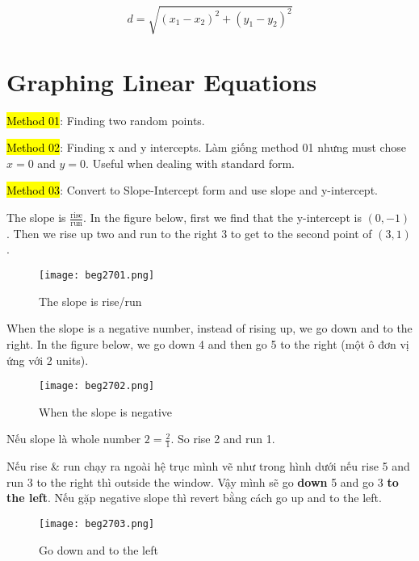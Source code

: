 \begin{equation}
  d = \sqrt{(x_{1}-x_{2})^{2} + (y_{1}-y_{2})^{2}}
  \label{eq:3.2}
\end{equation}

\section{Graphing Linear Equations}

\hl{Method 01}: Finding two random points.

\hl{Method 02}: Finding x and y intercepts. Làm giống method 01 nhưng must chose $x=0$ and $y=0$. Useful when dealing with standard form.


\hl{Method 03}: Convert to Slope-Intercept form and use slope and y-intercept.

The slope is $\frac{\text{rise}}{\text{run}}$. In the figure below, first we find that the y-intercept is $(0,-1)$. Then we rise up two and run to the right 3 to get to the second point of $(3,1)$.

\begin{figure}[htb!]
  \centering
  \texttt{[image: beg2701.png]}
  \caption{The slope is rise/run}
\end{figure}

\newpage

When the slope is a negative number, instead of rising up, we go down and to the right. In the figure below, we go down 4 and then go 5 to the right (một ô đơn vị ứng với 2 units).

\begin{figure}[htb!]
  \centering
  \texttt{[image: beg2702.png]}
  \caption{When the slope is negative}
\end{figure}

\vspace{0.5cm}

Nếu slope là whole number $2=\frac{2}{1}$. So rise 2 and run 1.


Nếu rise \& run chạy ra ngoài hệ trục mình vẽ như trong hình dưới nếu rise 5 and run 3 to the right thì outside the window. Vậy mình sẽ go \textbf{down} 5 and go 3 \textbf{to the left}. Nếu gặp negative slope thì revert bằng cách go up and to the left.

\begin{figure}[htb!]
  \centering
  \texttt{[image: beg2703.png]}
  \caption{Go down and to the left}
\end{figure}

